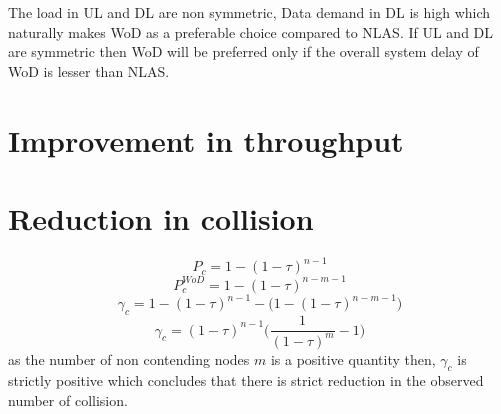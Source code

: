 \documentclass[conference]{IEEEtran}
\begin{document}
The load in UL and DL are non symmetric, Data demand in DL is high which naturally makes WoD as a preferable choice compared to NLAS. If UL and DL are symmetric then WoD will be preferred only if the overall system delay of WoD is lesser than NLAS.




\section{Improvement in throughput}

\section{Reduction in collision}
\begin{equation}
P_{c}=1-(1-\tau)^{n-1}
\end{equation}
\begin{equation}
P_{c}^{WoD}=1-(1-\tau)^{n-m-1}
\end{equation}
\begin{equation}
\gamma_{c}=1-(1-\tau)^{n-1} - \big(1-(1-\tau)^{n-m-1}\big)
\end{equation}
\begin{equation}
\gamma_{c}=(1-\tau)^{n-1}\Big(\frac{1}{(1-\tau)^m} -1\Big)
\end{equation}
as the number of non contending nodes $m$ is a positive quantity then, $\gamma_{c}$ is strictly positive which concludes that there is strict reduction in the observed number of collision.
\end{document}
